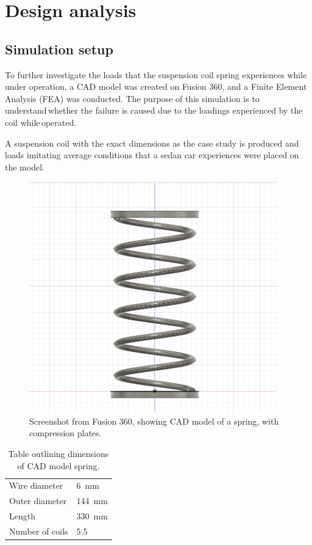 \documentclass[11pt]{article}
\begin{document}
\section{Design analysis}
\subsection{Simulation setup}
To further investigate the loads that the suspension coil spring experiences while under operation, a CAD model was created on Fusion 360, and a Finite Element Analysis (FEA) was conducted. The purpose of this simulation is to understand whether the failure is caused due to the loadings experienced by the coil while operated.  

A suspension coil with the exact dimensions as the case study is produced and loads imitating average conditions that a sedan car experiences were placed on the model. 
\begin{figure}[H]
    \centering
    \includegraphics[height = 10cm]{./img/springmodel.png}
    \caption{Screenshot from Fusion 360, showing CAD model of a spring, with compression plates.}
    \label{fig:cad1}
\end{figure}
\begin{table}[H]
    \centering
    \begin{tabular}{@{}ll@{}}
        \toprule
        Wire diameter & \SI{6}{\milli\meter}\\
		Outer diameter & \SI{144}{\milli\meter}\\
		Length & \SI{330}{\milli\meter}\\
		Number of coils & 5.5\\
        \bottomrule
    \end{tabular}
	\caption{Table outlining dimensions of CAD model spring.}
\end{table}
\end{document}
